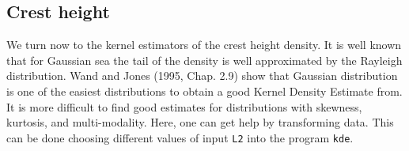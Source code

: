 \subsection{Crest height}
We turn now to the kernel estimators of the crest height density.
It is well known that for Gaussian sea the tail of the density is
well approximated by the Rayleigh distribution.
Wand and Jones (1995, Chap. 2.9) show that Gaussian distribution is one
of the easiest distributions to obtain a good Kernel Density Estimate from.
It is more difficult to find good estimates for distributions with
skewness, kurtosis, and multi-modality. Here, one can get help by
transforming data. This can be done choosing different values of input
{\tt L2} into the program {\tt kde}.


